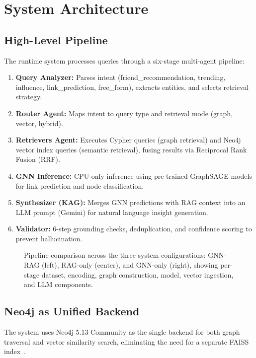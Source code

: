 \documentclass[conference]{IEEEtran}
\begin{document}
\section{System Architecture}

\subsection{High-Level Pipeline}
The runtime system processes queries through a six-stage multi-agent pipeline:

\begin{enumerate}
  \item \textbf{Query Analyzer:} Parses intent (friend\_recommendation, trending, influence, link\_prediction, free\_form), extracts entities, and selects retrieval strategy.
  \item \textbf{Router Agent:} Maps intent to query type and retrieval mode (graph, vector, hybrid).
  \item \textbf{Retrievers Agent:} Executes Cypher queries (graph retrieval) and Neo4j vector index queries (semantic retrieval), fusing results via Reciprocal Rank Fusion (RRF).
  \item \textbf{GNN Inference:} CPU-only inference using pre-trained GraphSAGE models for link prediction and node classification.
  \item \textbf{Synthesizer (KAG):} Merges GNN predictions with RAG context into an LLM prompt (Gemini) for natural language insight generation.
  \item \textbf{Validator:} 6-step grounding checks, deduplication, and confidence scoring to prevent hallucination.
\end{enumerate}

\begin{figure}[t]
  \centering
  
  \caption{Pipeline comparison across the three system configurations: GNN-RAG (left), RAG-only (center), and GNN-only (right), showing per-stage dataset, encoding, graph construction, model, vector ingestion, and LLM components.}
  \label{fig:arch}
\end{figure}

\subsection{Neo4j as Unified Backend}
The system uses Neo4j 5.13 Community as the single backend for both graph traversal and vector similarity search, eliminating the need for a separate FAISS index~\cite{arch_md_internal}.
\end{document}
